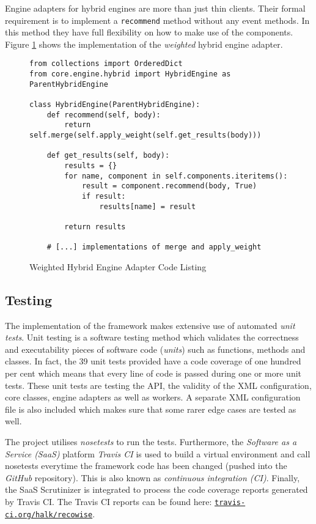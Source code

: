 Engine adapters for hybrid engines are more than just thin clients. Their formal requirement is to implement a \texttt{recommend} method without any event methods. In this method they have full flexibility on how to make use of the components. Figure \ref{fig:implementation-framework-hybrid-engine-adapter} shows the implementation of the \emph{weighted} hybrid engine adapter.

\begin{figure}[!ht]
    \begin{verbatim}
from collections import OrderedDict
from core.engine.hybrid import HybridEngine as ParentHybridEngine

class HybridEngine(ParentHybridEngine):
    def recommend(self, body):
        return self.merge(self.apply_weight(self.get_results(body)))

    def get_results(self, body):
        results = {}
        for name, component in self.components.iteritems():
            result = component.recommend(body, True)
            if result:
                results[name] = result

        return results

    # [...] implementations of merge and apply_weight
    \end{verbatim}
    \caption{Weighted Hybrid Engine Adapter Code Listing}
    \label{fig:implementation-framework-hybrid-engine-adapter}
\end{figure}

\subsection{Testing}

The implementation of the framework makes extensive use of automated \emph{unit tests}. Unit testing is a software testing method which validates the correctness and executability pieces of software code (\emph{units}) such as functions, methods and classes. In fact, the 39 unit tests provided have a code coverage of one hundred per cent which means that every line of code is passed during one or more unit tests. These unit tests are testing the API, the validity of the XML configuration, core classes, engine adapters as well as workers. A separate XML configuration file is also included which makes sure that some rarer edge cases are tested as well.

The project utilises \emph{nosetests} to run the tests. Furthermore, the \emph{Software as a Service (SaaS)} platform \emph{Travis CI} is used to build a virtual environment and call nosetests everytime the framework code has been changed (pushed into the \emph{GitHub} repository). This is also known as \emph{continuous integration (CI)}. Finally, the SaaS Scrutinizer is integrated to process the code coverage reports generated by Travis CI. The Travis CI reports can be found here: \href{https://travis-ci.org/halk/recowise}{\texttt{travis-ci.org/halk/recowise}}.

